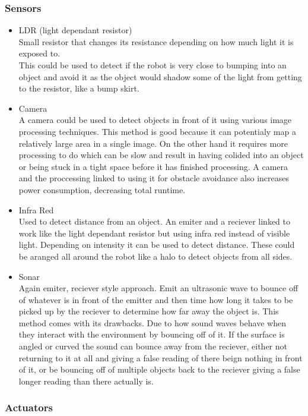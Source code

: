 \documentclass[11pt,fleqn,twoside]{article}
\begin{document}
\subsubsection{Sensors}
\begin{itemize}
\item LDR (light dependant resistor)
\\Small resistor that changes its resistance depending on how much light it is exposed to.
\\This could be used to detect if the robot is very close to bumping into an object and avoid it as the object would shadow some of the light from getting to the resistor, like a bump skirt.
\item Camera
\\A camera could be used to detect objects in front of it using various image processing techniques.  This method is good because it can potentialy map a relatively large area in a single image.  On the other hand it requires more processing to do which can be slow and result in having colided into an object or being stuck in a tight space before it has finished processing. A camera and the proccessing linked to using it for obstacle avoidance also increases power consumption, decreasing total runtime.
\item Infra Red
\\Used to detect distance from an object.  An emiter and a reciever linked to work like the light dependant resistor but using infra red instead of visible light.  Depending on intensity it can be used to detect distance.  These could be aranged all around the robot like a halo to detect objects from all sides.
\item Sonar
\\Again emiter, reciever style approach.  Emit an ultrasonic wave to bounce off of whatever is in  front of the emitter and then time how long it takes to be picked up by the reciever to determine how far away the object is.  This method comes with its drawbacks.  Due to how sound waves behave when they interact with the environment by bouncing off of it.  If the surface is angled or curved the sound can bounce away from the reciever, either not returning to it at all and giving a false reading of there beign nothing in front of it, or be bouncing off of multiple objects back to the reciever giving a false longer reading than there actually is.
\end{itemize}
\subsubsection{Actuators}
\end{document}
